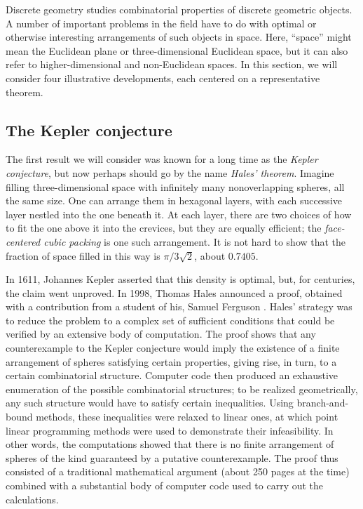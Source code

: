 \documentclass[12pt]{amsart}
\theoremstyle{definition}
\theoremstyle{remark}
\numberwithin{equation}{section}
\begin{document}
Discrete geometry studies combinatorial properties of discrete geometric objects. A number of important problems in the field have to do with optimal or otherwise interesting arrangements of such objects in space. Here, ``space'' might mean the Euclidean plane or three-dimensional Euclidean space, but it can also refer to higher-dimensional and non-Euclidean spaces. In this section, we will consider four illustrative developments, each centered on a representative theorem.

\subsection{The Kepler conjecture}

The first result we will consider was known for a long time as the \emph{Kepler conjecture}, but now perhaps should go by the name \emph{Hales' theorem}. Imagine filling three-dimensional space with infinitely many nonoverlapping spheres, all the same size. One can arrange them in hexagonal layers, with each successive layer nestled into the one beneath it. At each layer, there are two choices of how to fit the one above it into the crevices, but they are equally efficient; the \emph{face-centered cubic packing} is one such arrangement. It is not hard to show that the fraction of space filled in this way is $\pi / 3 \sqrt 2$, about $0.7405$.

In 1611, Johannes Kepler asserted that this density is optimal, but, for centuries, the claim went unproved. In 1998, Thomas Hales announced a proof, obtained with a contribution from a student of his, Samuel Ferguson \cite{hales:05}. Hales' strategy was to reduce the problem to a complex set of sufficient conditions that could be verified by an extensive body of computation. The proof shows that any counterexample to the Kepler conjecture would imply the existence of a finite arrangement of spheres satisfying certain properties, giving rise, in turn, to a certain combinatorial structure. Computer code then produced an exhaustive enumeration of the possible combinatorial structures; to be realized geometrically, any such structure would have to satisfy certain inequalities. Using branch-and-bound methods, these inequalities were relaxed to linear ones, at which point linear programming methods were used to demonstrate their infeasibility. In other words, the computations showed that there is no finite arrangement of spheres of the kind guaranteed by a putative counterexample. The proof thus consisted of a traditional mathematical argument (about 250 pages at the time) combined with a substantial body of computer code used to carry out the calculations.
\end{document}
